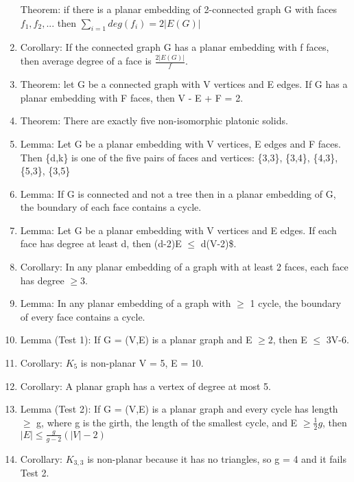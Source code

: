 \documentclass[]{article}
\begin{document}
\begin{enumerate}
  Theorem: if there is a planar embedding of 2-connected graph G with
  faces $f_1, f_2, ...$ then $\sum_{i=1} deg(f_i) = 2|E(G)|$
\item
  Corollary: If the connected graph G has a planar embedding with f
  faces, then average degree of a face is $\frac{2|E(G)|}{f}$.
\item
  Theorem: let G be a connected graph with \textbar{}V\textbar{}
  vertices and \textbar{}E\textbar{} edges. If G has a planar embedding
  with \textbar{}F\textbar{} faces, then \textbar{}V\textbar{} -
  \textbar{}E\textbar{} + \textbar{}F\textbar{} = 2.
\item
  Theorem: There are exactly five non-isomorphic platonic solids.
\item
  Lemma: Let G be a planar embedding with \textbar{}V\textbar{}
  vertices, \textbar{}E\textbar{} edges and \textbar{}F\textbar{} faces.
  Then \{d,k\} is one of the five pairs of faces and vertices: \{3,3\},
  \{3,4\}, \{4,3\}, \{5,3\}, \{3,5\}
\item
  Lemma: If G is connected and not a tree then in a planar embedding of
  G, the boundary of each face contains a cycle.
\item
  Lemma: Let G be a planar embedding with \textbar{}V\textbar{} vertices
  and \textbar{}E\textbar{} edges. If each face has degree at least d,
  then (d-2)\textbar{}E\textbar{} $\leq$ d(\textbar{}V\textbar{}-2)\$.
\item
  Corollary: In any planar embedding of a graph with at least 2 faces,
  each face has degree $\geq 3$.
\item
  Lemma: In any planar embedding of a graph with $\geq$ 1 cycle, the
  boundary of every face contains a cycle.
\item
  Lemma (Test 1): If G = (V,E) is a planar graph and
  \textbar{}E\textbar{} $\geq 2$, then \textbar{}E\textbar{} $\leq$
  3\textbar{}V\textbar{}-6.
\item
  Corollary: $K_5$ is non-planar \textbar{}V\textbar{} = 5,
  \textbar{}E\textbar{} = 10.
\item
  Corollary: A planar graph has a vertex of degree at most 5.
\item
  Lemma (Test 2): If G = (V,E) is a planar graph and every cycle has
  length $\geq$ g, where g is the girth, the length of the smallest
  cycle, and \textbar{}E\textbar{} $\geq \frac{1}{2}g$, then
  $|E| \leq \frac{g}{g-2}(|V| - 2)$
\item
  Corollary: $K_{3,3}$ is non-planar because it has no triangles, so g =
  4 and it fails Test 2.

\end{enumerate}
\end{document}

